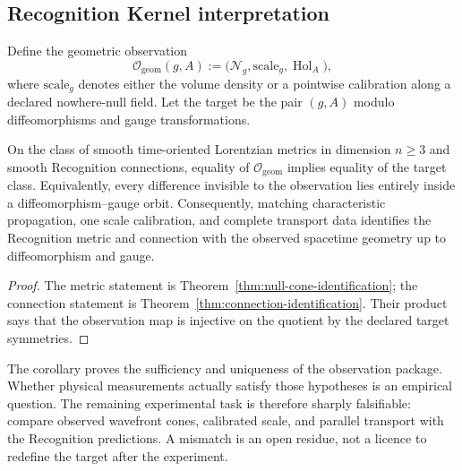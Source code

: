 \subsection{Recognition Kernel interpretation}

Define the geometric observation
\[
\mathcal O_{\mathrm{geom}}(g,A)
:=\bigl(\mathcal N_g,\mathrm{scale}_g,\operatorname{Hol}_A\bigr),
\]
where $\mathrm{scale}_g$ denotes either the volume density or a pointwise calibration along a declared nowhere-null field.  Let the target be the pair $(g,A)$ modulo diffeomorphisms and gauge transformations.

\begin{corollary}
\label{cor:target-faithful-spacetime}
On the class of smooth time-oriented Lorentzian metrics in dimension $n\ge3$ and smooth Recognition connections, equality of $\mathcal O_{\mathrm{geom}}$ implies equality of the target class.  Equivalently, every difference invisible to the observation lies entirely inside a diffeomorphism--gauge orbit.  Consequently, matching characteristic propagation, one scale calibration, and complete transport data identifies the Recognition metric and connection with the observed spacetime geometry up to diffeomorphism and gauge.
\end{corollary}

\begin{proof}
The metric statement is Theorem~\ref{thm:null-cone-identification}; the connection statement is Theorem~\ref{thm:connection-identification}.  Their product says that the observation map is injective on the quotient by the declared target symmetries.
\end{proof}

\begin{remark}
The corollary proves the sufficiency and uniqueness of the observation package.  Whether physical measurements actually satisfy those hypotheses is an empirical question.  The remaining experimental task is therefore sharply falsifiable: compare observed wavefront cones, calibrated scale, and parallel transport with the Recognition predictions.  A mismatch is an open residue, not a licence to redefine the target after the experiment.
\end{remark}
